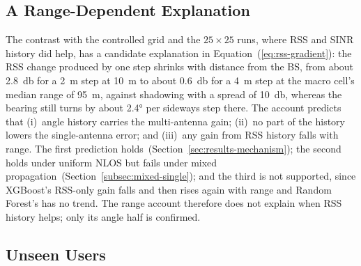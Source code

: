 \subsection{A Range-Dependent Explanation}
\label{subsec:hypothesis}

The contrast with the controlled grid and the $25\times25$ runs, where RSS and SINR history did help, has a candidate explanation in Equation~(\ref{eq:rss-gradient}): the RSS change produced by one step shrinks with distance from the BS, from about \SI{2.8}{\decibel} for a \SI{2}{\meter} step at \SI{10}{\meter} to about \SI{0.6}{\decibel} for a \SI{4}{\meter} step at the macro cell's median range of \SI{95}{\meter}, against shadowing with a spread of \SI{10}{\decibel}, whereas the bearing still turns by about \ang{2.4} per sideways step there. The account predicts that (i)~angle history carries the multi-antenna gain; (ii)~no part of the history lowers the single-antenna error; and (iii)~any gain from RSS history falls with range. The first prediction holds~(Section~\ref{sec:results-mechanism}); the second holds under uniform NLOS but fails under mixed propagation~(Section~\ref{subsec:mixed-single}); and the third is not supported, since XGBoost's RSS-only gain falls and then rises again with range and Random Forest's has no trend. The range account therefore does not explain when RSS history helps; only its angle half is confirmed.

\subsection{Unseen Users}
\label{subsec:unseen-users}

